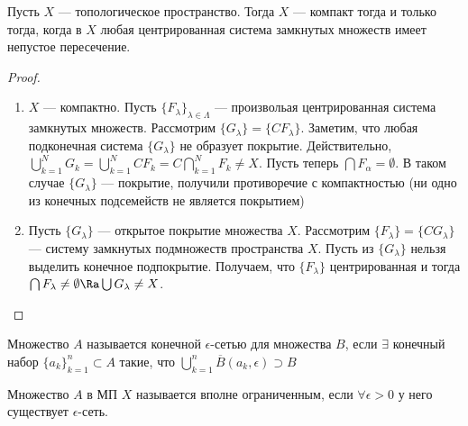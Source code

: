 \begin{theorem}
    Пусть \(X\) --- топологическое пространство. Тогда \(X\) --- компакт тогда и только тогда, когда в \(X\) любая центрированная система замкнутых множеств имеет непустое пересечение.
\end{theorem}
\begin{proof}
    \begin{enumerate}
        \item[\(\Ra\)] \(X\) --- компактно. Пусть \(\{F_\lambda\}_{\lambda \in \Lambda}\) --- произвольая центрированная система замкнутых множеств. Рассмотрим \(\{G_\lambda\} = \{CF_\lambda\}\). Заметим, что любая подконечная система \(\{G_\lambda\}\) не образует покрытие.  Действительно, \(\bigcup_{k = 1}^N G_k = \bigcup_{k = 1}^N CF_k = C\bigcap_{k = 1}^N F_k \ne X\). Пусть теперь \(\bigcap F_\alpha = \emptyset\). В таком случае \(\{G_\lambda\}\) --- покрытие, получили противоречие с компактностью (ни одно из конечных подсемейств не является покрытием)
        \item[\(\La\)] Пусть \(\{G_\lambda\}\) --- открытое покрытие множества \(X\). Рассмотрим \(\{F_\lambda\} = \{CG_\lambda\}\) --- систему замкнутых подмножеств пространства \(X\). Пусть из \(\{G_\lambda\}\) нельзя выделить конечное подпокрытие. Получаем, что \(\{F_\lambda\}\) центрированная и тогда \(\bigcap F_\lambda \ne \emptyset \Ra \bigcup G_\lambda \ne X\).
    \end{enumerate}
\end{proof}

\begin{definition}
    Множество \(A\) называется конечной \(\epsilon\)-сетью для множества \(B\), если \(\exists\) конечный набор \(\{a_k\}_{k = 1}^n \subset A\) такие, что \(\bigcup_{k = 1}^n \overline{B}(a_k, \epsilon) \supset B\)
\end{definition}

\begin{definition}
    Множество \(A\) в МП \(X\) называется вполне ограниченным, если \(\forall \epsilon > 0\) у него существует \(\epsilon\)-сеть.
\end{definition}

